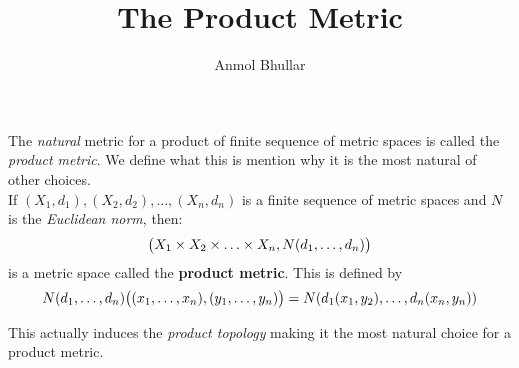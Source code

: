 \documentclass{article}
\title{The Product Metric}
\author{Anmol Bhullar}
\begin{document}
    \maketitle
    The \textit{natural} metric for a product of finite sequence of metric spaces is called the \textit{product metric}. We define what this
    is mention why it is the most natural of other choices.\\

    If $(X_1,d_1),(X_2,d_2),\hdots,(X_n,d_n)$ is a finite sequence of metric spaces and $N$ is the \textit{Euclidean norm}, then:
    \[ \big{(}X_1 \times X_2 \times \hdots \times X_n,N(d_1,\hdots,d_n)\big{)} \] 
    is a metric space called the \textbf{product metric}. This is defined by
    \[ N(d_1,\hdots,d_n)\big{(}(x_1,\hdots,x_n),(y_1,\hdots,y_n)\big{)} = N(d_1(x_1,y_2),\dots,d_n(x_n,y_n)) \]

    This actually induces the \textit{product topology} making it the most natural choice for a product metric.
\end{document}
